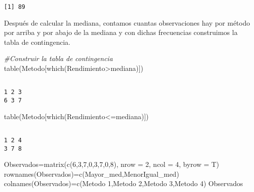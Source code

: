 \documentclass[
  a4paper,
  oneside,
  openany]{book}
\newenvironment{Shaded}{\begin{snugshade}}{\end{snugshade}}
\newcommand{\AttributeTok}[1]{\textcolor[rgb]{0.77,0.63,0.00}{#1}}
\newcommand{\CommentTok}[1]{\textcolor[rgb]{0.56,0.35,0.01}{\textit{#1}}}
\newcommand{\DecValTok}[1]{\textcolor[rgb]{0.00,0.00,0.81}{#1}}
\newcommand{\FunctionTok}[1]{\textcolor[rgb]{0.00,0.00,0.00}{#1}}
\newcommand{\NormalTok}[1]{#1}
\newcommand{\OtherTok}[1]{\textcolor[rgb]{0.56,0.35,0.01}{#1}}
\newcommand{\SpecialCharTok}[1]{\textcolor[rgb]{0.00,0.00,0.00}{#1}}
\newcommand{\StringTok}[1]{\textcolor[rgb]{0.31,0.60,0.02}{#1}}
\begin{document}
\begin{verbatim}
[1] 89
\end{verbatim}

Después de calcular la mediana, contamos cuantas observaciones hay por método por arriba y por abajo de la mediana y con dichas frecuencias construimos la tabla de contingencia.

\begin{Shaded}
\begin{Highlighting}[]
\CommentTok{\#Construir la tabla de contingencia}
\FunctionTok{table}\NormalTok{(Metodo[}\FunctionTok{which}\NormalTok{(Rendimiento}\SpecialCharTok{\textgreater{}}\NormalTok{mediana)])}
\end{Highlighting}
\end{Shaded}

\begin{verbatim}

1 2 3 
6 3 7 
\end{verbatim}

\begin{Shaded}
\begin{Highlighting}[]
\FunctionTok{table}\NormalTok{(Metodo[}\FunctionTok{which}\NormalTok{(Rendimiento}\SpecialCharTok{\textless{}=}\NormalTok{mediana)])}
\end{Highlighting}
\end{Shaded}

\begin{verbatim}

1 2 4 
3 7 8 
\end{verbatim}

\begin{Shaded}
\begin{Highlighting}[]
\NormalTok{Observados}\OtherTok{=}\FunctionTok{matrix}\NormalTok{(}\FunctionTok{c}\NormalTok{(}\DecValTok{6}\NormalTok{,}\DecValTok{3}\NormalTok{,}\DecValTok{7}\NormalTok{,}\DecValTok{0}\NormalTok{,}\DecValTok{3}\NormalTok{,}\DecValTok{7}\NormalTok{,}\DecValTok{0}\NormalTok{,}\DecValTok{8}\NormalTok{), }\AttributeTok{nrow =} \DecValTok{2}\NormalTok{, }\AttributeTok{ncol =} \DecValTok{4}\NormalTok{, }\AttributeTok{byrow =}\NormalTok{ T)}
\FunctionTok{rownames}\NormalTok{(Observados)}\OtherTok{=}\FunctionTok{c}\NormalTok{(}\StringTok{\textquotesingle{}Mayor\_med\textquotesingle{}}\NormalTok{,}\StringTok{\textquotesingle{}MenorIgual\_med\textquotesingle{}}\NormalTok{)}
\FunctionTok{colnames}\NormalTok{(Observados)}\OtherTok{=}\FunctionTok{c}\NormalTok{(}\StringTok{\textquotesingle{}Metodo 1\textquotesingle{}}\NormalTok{,}\StringTok{\textquotesingle{}Metodo 2\textquotesingle{}}\NormalTok{,}\StringTok{\textquotesingle{}Metodo 3\textquotesingle{}}\NormalTok{,}\StringTok{\textquotesingle{}Metodo 4\textquotesingle{}}\NormalTok{)}
\NormalTok{Observados}
\end{Highlighting}
\end{Shaded}
\end{document}
